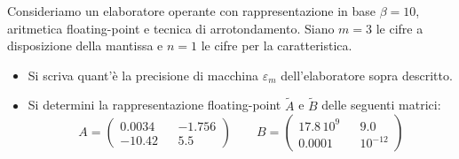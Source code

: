 Consideriamo un elaboratore operante con rappresentazione in base
$\beta=10$, aritmetica floating-point e tecnica di arrotondamento.
Siano $m=3$ le cifre a disposizione della mantissa e $n=1$ le
cifre per la caratteristica.
\begin{itemize}
\item Si scriva quant'\`{e} la precisione di macchina
$\varepsilon_m$ dell'elaboratore sopra descritto.
\item Si
determini la rappresentazione floating-point $\widetilde{A}$ e
$\widetilde{B}$ delle seguenti matrici:
\[
A=\left(
\begin{array}{ccc}
0.0034 && -1.756 \\
-10.42 && 5.5
\end{array}
\right) \quad \quad B=\left(
\begin{array}{ccc}
17.8\, 10^{9} & & 9.0 \\
0.0001 &  & 10^{-12}
\end{array}
\right)
\]
\end{itemize}
